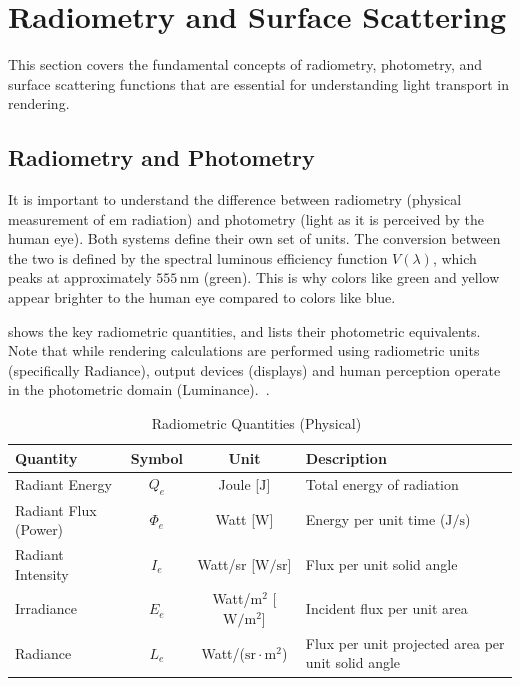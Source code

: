 \section{Radiometry and Surface Scattering}\label{sec:radiometry-surface-reflectance}

This section covers the fundamental concepts of radiometry, photometry, and surface scattering functions 
that are essential for understanding light transport in rendering.

\subsection{Radiometry and Photometry}\label{subsec:radiometry-photometry}

It is important to understand the difference between radiometry (physical measurement of \gls{em} radiation)
and photometry (light as it is perceived by the human eye).
Both systems define their own set of units.
The conversion between the two is defined by the spectral luminous efficiency function $V(\lambda)$,
which peaks at approximately $555\,\mathrm{nm}$ (green).
This is why colors like green and yellow appear brighter to the human eye compared to colors like blue.

 shows the key radiometric quantities,
and  lists their photometric equivalents.
Note that while rendering calculations are performed using radiometric units (specifically Radiance),
output devices (displays) and human perception operate in the photometric domain (Luminance).~\cite{tuwien_rendering_2020}.

\begin{table}
    \centering
    \caption{Radiometric Quantities (Physical)~\cite{tuwien_rendering_2020}}
    \label{tab:radiometric-quantities}
    \begin{tabular}{lccl}
        \toprule
        \textbf{Quantity} & \textbf{Symbol} & \textbf{Unit} & \textbf{Description} \\
        \midrule
        Radiant Energy & $Q_e$ & Joule [$\mathrm{J}$] & Total energy of radiation \\
        Radiant Flux (Power) & $\Phi_e$ & Watt [$\mathrm{W}$] & Energy per unit time ($\mathrm{J/s}$) \\
        Radiant Intensity & $I_e$ & Watt/sr [$\mathrm{W/sr}$] & Flux per unit solid angle \\
        Irradiance & $E_e$ & Watt/$\mathrm{m}^2$ [$\mathrm{W/m^2}$] & Incident flux per unit area \\
        Radiance & $L_e$ & Watt/($\mathrm{sr} \cdot \mathrm{m}^2$) & Flux per unit projected area per unit solid angle \\
        \bottomrule
    \end{tabular}
\end{table}


